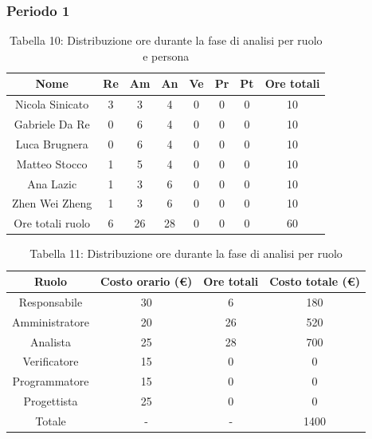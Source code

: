 \subsubsection{Periodo 1}
%
\begin{table}[h]
	\setlength\extrarowheight{5pt}
	\centering
	\begin{tabularx}{\textwidth}{|ccccccc|c|}
		\hline
		\rowcolor{white}
		\textbf{Nome} & \textbf{Re} & \textbf{Am} & \textbf{An} & \textbf{Ve} & \textbf{Pr}& \textbf{Pt} & \textbf{Ore totali} \\
		\hline
		Nicola Sinicato &3&3&4&0&0&0&10 \\
		Gabriele Da Re &0&6&4&0&0&0&10 \\
		Luca Brugnera &0&6&4&0&0&0&10 \\
		Matteo Stocco &1&5&4&0&0&0&10 \\
		Ana Lazic &1&3&6&0&0&0&10 \\
		Zhen Wei Zheng &1&3&6&0&0&0&10 \\
		\hline
		Ore totali ruolo &6&26&28&0&0&0&60 \\
		\hline
	\end{tabularx}
	\vspace{10pt}
	\caption{Tabella 10: Distribuzione ore durante la fase di analisi per ruolo e persona}
\end{table}
\begin{table}[h]
	\setlength\extrarowheight{5pt}
	\centering
	\begin{tabularx}{\textwidth}{|ccc|c|}
		\hline
		\rowcolor{white}
		\textbf{Ruolo} & \textbf{Costo orario (€)} & \textbf{Ore totali} & \textbf{Costo totale (€)} \\
		\hline
		Responsabile &30&6&180 \\
		Amministratore &20&26&520 \\
		Analista &25&28&700 \\
		Verificatore &15&0&0 \\
		Programmatore &15&0&0 \\
		Progettista &25&0&0 \\
		\hline
		Totale &-&-&1400 \\
		\hline
	\end{tabularx}
    \vspace{10pt}
	\caption{Tabella 11: Distribuzione ore durante la fase di analisi per ruolo}
\end{table}
